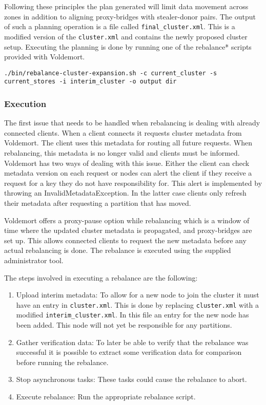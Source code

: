 Following these principles the plan generated will limit data movement across zones in addition to aligning proxy-bridges with stealer-donor pairs. The output of such a planning operation is a file called \texttt{final\_cluster.xml}. This is a modified version of the \texttt{cluster.xml} and contains the newly proposed cluster setup. Executing the planning is done by running one of the rebalance* scripts provided with Voldemort. 

\begin{lstlisting}[style=customc, caption=Sample command to plan a cluster expansion. Outputs a \texttt{final\_cluster.xml} as well as a plan]
./bin/rebalance-cluster-expansion.sh -c current_cluster -s current_stores -i interim_cluster -o output dir
\end{lstlisting}

\subsubsection{Execution}
The first issue that needs to be handled when rebalancing is dealing with already connected clients. When a client connects it requests cluster metadata from Voldemort. The client uses this metadata for routing all future requests. When rebalancing, this metadata is no longer valid and clients must be informed. Voldemort has two ways of dealing with this issue. Either the client can check metadata version on each request or nodes can alert the client if they receive a request for a key they do not have responsibility for.  This alert is implemented by throwing an InvalidMetadataException. In the latter case clients only refresh their metadata after requesting a partition that has moved. 

Voldemort offers a proxy-pause option while rebalancing which is a window of time where the updated cluster metadata is propagated, and proxy-bridges are set up. This allows connected clients to request the new metadata before any actual rebalancing is done. The rebalance is executed using the supplied administrator tool. 

The steps involved in executing a rebalance are the following:

\begin{enumerate}
\item Upload interim metadata: To allow for a new node to join the cluster it must have an entry in \texttt{cluster.xml}. This is done by replacing \texttt{cluster.xml} with a modified \texttt{interim\_cluster.xml}. In this file an entry for the new node has been added. This node will not yet be responsible for any partitions.
\item Gather verification data: To later be able to verify that the rebalance was successful it is possible to extract some verification data for comparison before running the rebalance.
\item Stop asynchronous tasks: These tasks could cause the rebalance to abort.
\item Execute rebalance: Run the appropriate rebalance script.
\end{enumerate}

